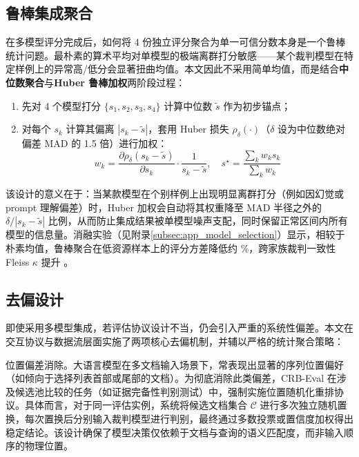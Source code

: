 \subsection{鲁棒集成聚合}
\label{sec:robust_aggregation}

在多模型评分完成后，如何将 4 份独立评分聚合为单一可信分数本身是一个鲁棒统计问题。最朴素的算术平均对单模型的极端离群打分敏感——某个裁判模型在特定样例上的异常高/低分会显著扭曲均值。本文因此不采用简单均值，而是结合\textbf{中位数聚合}与\textbf{Huber 鲁棒加权}两阶段过程：

\begin{enumerate}
    \item 先对 4 个模型打分 $\{s_1, s_2, s_3, s_4\}$ 计算中位数 $\tilde{s}$ 作为初步锚点；
    \item 对每个 $s_k$ 计算其偏离 $|s_k - \tilde{s}|$，套用 Huber 损失 $\rho_\delta(\cdot)$（$\delta$ 设为中位数绝对偏差 MAD 的 1.5 倍）进行加权：
\begin{equation}
    w_k = \frac{\partial \rho_\delta(s_k - \tilde{s})}{\partial s_k} \cdot \frac{1}{s_k - \tilde{s}},\quad s^\star = \frac{\sum_k w_k s_k}{\sum_k w_k}
\end{equation}
\end{enumerate}

该设计的意义在于：当某款模型在个别样例上出现明显离群打分（例如因幻觉或 prompt 理解偏差）时，Huber 加权会自动将其权重降至 MAD 半径之外的 $\delta / |s_k - \tilde{s}|$ 比例，从而防止集成结果被单模型噪声支配，同时保留正常区间内所有模型的信息量。消融实验（见附录\ref{subsec:app_model_selection}）显示，相较于朴素均值，鲁棒聚合在低资源样本上的评分方差降低约 \%，跨家族裁判一致性 Fleiss $\kappa$ 提升 。



\subsection{去偏设计}



即使采用多模型集成，若评估协议设计不当，仍会引入严重的系统性偏差。本文在交互协议与数据流层面实施了两项核心去偏机制，并辅以严格的统计聚合策略：



位置偏差消除。大语言模型在多文档输入场景下，常表现出显著的序列位置偏好（如倾向于选择列表首部或尾部的文档）。为彻底消除此类偏差，CRB-Eval 在涉及候选池比较的任务（如证据完备性判别测试）中，强制实施位置随机化重排协议。具体而言，对于同一评估实例，系统将候选文档集合 $\mathcal{C}$ 进行多次独立随机置换，每次置换后分别输入裁判模型进行判别，最终通过多数投票或置信度加权得出稳定结论。该设计确保了模型决策仅依赖于文档与查询的语义匹配度，而非输入顺序的物理位置。



